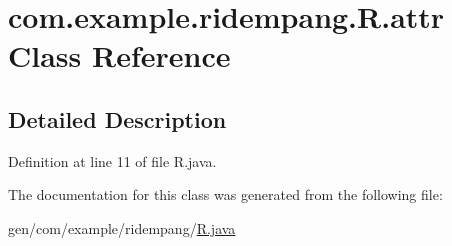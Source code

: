 \hypertarget{classcom_1_1example_1_1ridempang_1_1_r_1_1attr}{\section{com.\-example.\-ridempang.\-R.\-attr Class Reference}
\label{classcom_1_1example_1_1ridempang_1_1_r_1_1attr}
}


\subsection{Detailed Description}


Definition at line 11 of file R.\-java.



The documentation for this class was generated from the following file\-:\begin{DoxyCompactItemize}
\item 
gen/com/example/ridempang/\hyperlink{_r_8java}{R.\-java}\end{DoxyCompactItemize}
